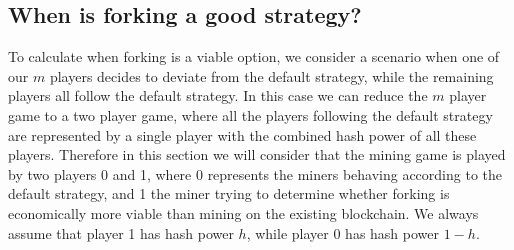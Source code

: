 \documentclass[a4paper,english,cleveref, autoref,numberwithinsect]{lipics-v2019}
\newcommand{\bP}{\mathbf{P}}
\newcommand{\meet}{\text{\rm meet}}
\newcommand{\rpa}{r_p}
\begin{document}
%
%

\subsection{When is forking a good strategy?}
\label{sec-forkingstrategies}

To calculate when forking is a viable option, we consider a scenario when one of our $m$ players decides to deviate from the default strategy, while the remaining players all follow the default strategy. 
In this case we can reduce the $m$ player game to a two player game, where all the players following the default strategy are represented by a single player %
with the combined hash power of all these players. Therefore in this section we will consider that the mining game is played by two players 0 and 1, where 0 represents the miners behaving according to the default strategy, and 1 the miner trying to determine whether forking is economically more viable than mining on the existing blockchain. We always assume that player 1 has hash power $h$, while player 0 has hash power $1-h$.
\end{document}
